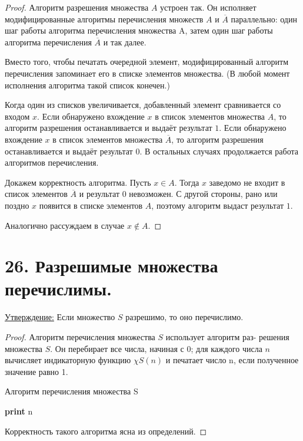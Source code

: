\documentclass[a4paper, 12pt]{article}
\newcommand{\statement}{\underline{Утверждение:} }
\begin{document}
\begin{proof}

Алгоритм разрешения множества $A$ устроен так. Он исполняет
модифицированные алгоритмы перечисления множеств $A$ и $\overline{A}$ параллельно: один шаг работы алгоритма перечисления множества A, затем один шаг работы алгоритма перечисления $\overline{A}$ и так далее.

Вместо того, чтобы печатать очередной элемент, модифицированный алгоритм
перечисления запоминает его в списке элементов множества. (В любой момент исполнения алгоритма такой список конечен.)

Когда один из списков увеличивается, добавленный элемент сравнивается со входом $x$. Если обнаружено вхождение $x$ в список элементов множества $A$, то алгоритм разрешения останавливается и выдаёт результат $1$. Если обнаружено вхождение $x$ в список элементов множества $\overline{A}$, то алгоритм разрешения останавливается и выдаёт результат 0. В остальных случаях продолжается работа алгоритмов перечисления.

Докажем корректность алгоритма. Пусть $x \in A$. Тогда $x$ заведомо не входит в список элементов $\overline{A}$ и результат $0$ невозможен. С другой стороны, рано или поздно $x$ появится в списке элементов $A$, поэтому алгоритм выдаст результат $1$.

Аналогично рассуждаем в случае $x \notin A$.

\end{proof}

\section*{26. Разрешимые множества перечислимы.}

\statement{Если множество $S$ разрешимо, то оно перечислимо.}

\begin{proof}
Алгоритм перечисления множества $S$ использует алгоритм раз-
решения множества $S$. Он перебирает все числа, начиная с 0; для каждого числа
$n$ вычисляет индикаторную функцию $\chi S(n)$ и печатает число n, если полученное
значение равно 1.

            \begin{algorithm}
            \caption{Алгоритм перечисления множества S}
            \begin{algorithmic}[1]
                        \State \textbf{print} n
                    \EndIf
                \EndFor
            \EndFunction
            \end{algorithmic}
            \end{algorithm}
            
Корректность такого алгоритма ясна из определений.
\end{proof}
\end{document}
